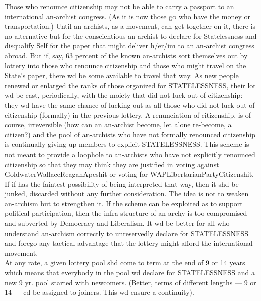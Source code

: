 Those who renounce citizenship may not be able to carry a passport to an international an-archist congress. (As it is now those go who have the money or transportation.) Until an-archists, as a movement, can get together on it, there is no alternative but for the conscientious an-archist to declare for Statelessness and disqualify Self for the paper that might deliver h/er/im to an an-archist congress abroad. But if, say, 63 percent of the known an-archists sort themselves out by lottery into those who renounce citizenship and those who might travel on the State's paper, there wd be some available to travel that way. As new people renewed or enlarged the ranks of those organized for STATELESSNESS, their lot wd be cast, periodically, with the moiety that did not luck-out of citizenship: they wd have the same chance of lucking out as all those who did not luck-out of citizenship (formally) in the previous lottery. A renunciation of citizenship, is of course, irreversible (how can an an-archist become, let alone re-become, a citizen?) and the pool of an-archists who have not formally renounced citizenship is continually giving up members to explicit STATELESSNESS. This scheme is not meant to provide a loophole to an-archists who have not explicitly renounced citizenship so that they may think they are justified in voting against GoldwaterWallaceReaganApeshit or voting for WAPLibertarianPartyCitizenshit. If if has the faintest possibility of being interpreted that way, then it shd be junked, discarded without any further consideration. The idea is not to weaken an-archism but to strengthen it. If the scheme can be exploited as to support political participation, then the infra-structure of an-archy is too compromised and subverted by Democracy and Liberalism. It wd be better for all who understand an-archism correctly to unreservedly declare for STATELESSNESS and forego any tactical advantage that the lottery might afford the international movement.\\
At any rate, a given lottery pool shd come to term at the end of 9 or 14 years which means that everybody in the pool wd declare for STATELESSNESS and a new 9 yr. pool started with newcomers. (Better, terms of different lengths --- 9 or 14 --- cd be assigned to joiners. This wd ensure a continuity).\\

